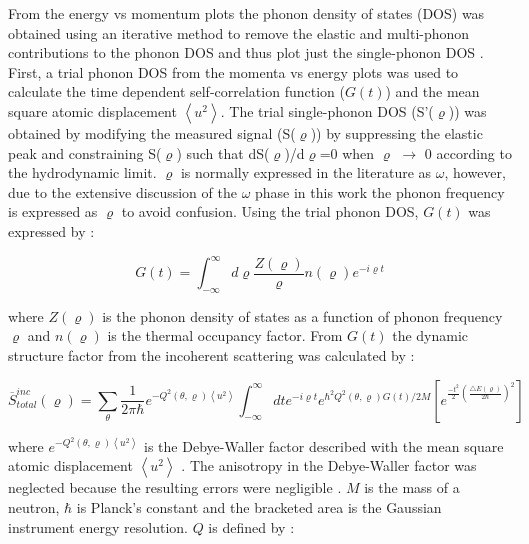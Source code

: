 From the energy vs momentum plots the phonon density of states (DOS) was obtained using an iterative method to remove the elastic and multi-phonon contributions to the phonon DOS and thus plot just the single-phonon DOS \cite{Fultz2009,Squires2012}. First, a trial phonon DOS from the momenta vs energy plots was used to calculate the time dependent self-correlation function ($G(t)$) and the mean square atomic displacement $\left< u^{2} \right>$. The trial single-phonon DOS (S'($\varrho$)) was obtained by modifying the measured signal (S($\varrho$)) by suppressing the elastic peak and constraining S($\varrho$) such that dS($\varrho$)/d$\varrho$=0 when $\varrho$ $\rightarrow$ 0 according to the hydrodynamic limit. $\varrho$ is normally expressed in the literature as $\omega$, however, due to the extensive discussion of the $\omega$ phase in this work the phonon frequency is expressed as $\varrho$ to avoid confusion. Using the trial phonon DOS, $G(t)$ was expressed by \cite{Manley2001,Manley2002}:

\begin{equation}
\label{eq: td_selfcorrelation}
G (t) = \int_{- \infty}^{\infty} d \varrho \frac{Z(\varrho)}{\varrho} n(\varrho) e^{- i \varrho t}
\end{equation}


\noindent where $Z(\varrho)$ is the phonon density of states as a function of phonon frequency $\varrho$ and $n(\varrho)$ is the thermal occupancy factor. From $G(t)$ the dynamic structure factor from the incoherent scattering was calculated by \cite{Manley2001,Manley2002}:

\begin{equation}
\label{eq: S_total_inc}
\overline{S}_{total}^{inc} (\varrho) = \sum_{\theta} \frac{1}{2 \pi \hbar} e^{- Q^{2} (\theta, \varrho) \left<u^{2} \right>} \int_{-\infty}^{\infty} dte^{-i \varrho t} e^{\hbar^{2}Q^{2}(\theta, \varrho) G(t)/2M} \left[ e^{\frac{-t^{2}}{2} \left(\frac{\bigtriangleup E (\varrho)}{2\hbar} \right)^{2}} \right]
\end{equation}

\noindent where $e^{-Q^{2}\left(\theta,\varrho \right) \left< u^{2} \right>}$ is the Debye-Waller factor described with the mean square atomic displacement $\left< u^{2} \right>$ \cite{Squires2012}. The anisotropy in the Debye-Waller factor was neglected because the resulting errors were negligible \cite{Manley2001}.  $M$ is the mass of a neutron, $\hbar$ is Planck's constant and the bracketed area is the Gaussian instrument energy resolution. $Q$ is defined by \cite{Manley2001,Manley2002}:

